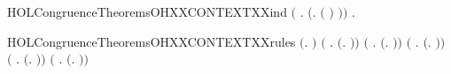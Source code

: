 \begin{SaveVerbatim}{HOLCongruenceTheoremsOHXXCONTEXTXXind}
       \ensuremath{(}\HOLSymConst{\HOLTokenForall{}} .   \HOLSymConst{\HOLTokenImp{}}  \ensuremath{(}\HOLTokenLambda{}.  \ensuremath{(} \ensuremath{)} \ensuremath{)}\ensuremath{)} \HOLSymConst{\HOLTokenImp{}}
       \HOLSymConst{\HOLTokenForall{}}.   \HOLSymConst{\HOLTokenImp{}}  
\end{SaveVerbatim}
\newcommand{\HOLCongruenceTheoremsOHXXCONTEXTXXind}{\UseVerbatim{HOLCongruenceTheoremsOHXXCONTEXTXXind}}
\begin{SaveVerbatim}{HOLCongruenceTheoremsOHXXCONTEXTXXrules}
\HOLTokenTurnstile{}  \ensuremath{(}\HOLTokenLambda{}. \ensuremath{)} \HOLSymConst{\HOLTokenConj{}}
   \ensuremath{(}\HOLSymConst{\HOLTokenForall{}} .   \HOLSymConst{\HOLTokenImp{}}  \ensuremath{(}\HOLTokenLambda{}. \HOLSymConst{\ensuremath{\ldotp}} \ensuremath{)}\ensuremath{)} \HOLSymConst{\HOLTokenConj{}}
   \ensuremath{(}\HOLSymConst{\HOLTokenForall{}} .   \HOLSymConst{\HOLTokenImp{}}  \ensuremath{(}\HOLTokenLambda{}.   \HOLSymConst{\ensuremath{+}} \ensuremath{)}\ensuremath{)} \HOLSymConst{\HOLTokenConj{}}
   \ensuremath{(}\HOLSymConst{\HOLTokenForall{}} .   \HOLSymConst{\HOLTokenImp{}}  \ensuremath{(}\HOLTokenLambda{}.  \HOLSymConst{\ensuremath{+}}  \ensuremath{)}\ensuremath{)} \HOLSymConst{\HOLTokenConj{}}
   \ensuremath{(}\HOLSymConst{\HOLTokenForall{}} .   \HOLSymConst{\HOLTokenImp{}}  \ensuremath{(}\HOLTokenLambda{}.   \HOLSymConst{\ensuremath{\mid}} \ensuremath{)}\ensuremath{)} \HOLSymConst{\HOLTokenConj{}}
   \ensuremath{(}\HOLSymConst{\HOLTokenForall{}} .   \HOLSymConst{\HOLTokenImp{}}  \ensuremath{(}\HOLTokenLambda{}.  \HOLSymConst{\ensuremath{\mid}}  \ensuremath{)}\ensuremath{)} \HOLSymConst{\HOLTokenConj{}}

\end{SaveVerbatim}
